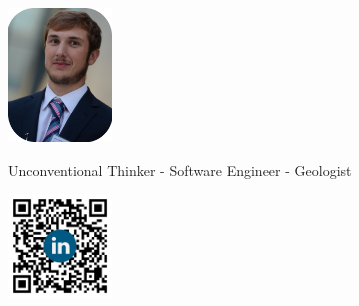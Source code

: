 \documentclass[]{friggeri-cv}
\begin{document}
\begin{figure}[!h]
	\begin{minipage}{0.48\textwidth}
		\begin{flushleft}
			\includegraphics[width=2.75cm]{img/profile.png}
		\end{flushleft}
	\end{minipage}\hfill
	{Unconventional Thinker - Software Engineer - Geologist}
	\begin{minipage}{0.48\textwidth}
		\begin{flushright}
			\includegraphics[width=2.75cm]{img/QR.png}
		\end{flushright}
	\end{minipage}
\end{figure}
\vspace{-0.75cm}
\end{document}
